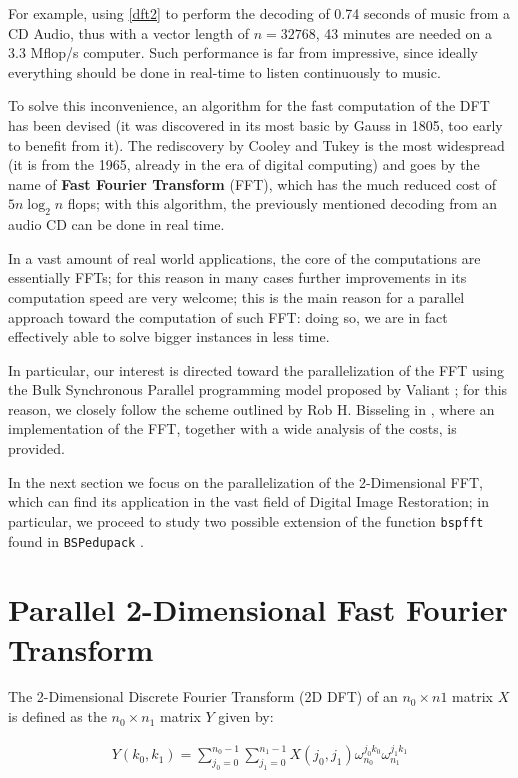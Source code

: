 \documentclass[a4paper,11pt]{article}
\begin{document}
For example, using \eqref{dft2} to perform the decoding of 0.74 seconds of music from a CD Audio, thus with a vector length of $n=32768$, 43 minutes are needed on a 3.3 Mflop/s computer. Such performance is far from impressive, since ideally everything should be done in real-time to listen continuously to music.

To solve this inconvenience, an algorithm for the fast computation of the DFT has been devised (it was discovered in its most basic by Gauss in 1805, too early to benefit from it). The rediscovery by Cooley and Tukey \citep{cooleytukey} is the most widespread (it is from the 1965, already in the era of digital computing) and goes by the name of \textbf{Fast Fourier Transform} (FFT), which has the much reduced cost of $5n \log_2 n$ flops; with this algorithm, the previously mentioned decoding from an audio CD can be done in real time.

In a vast amount of real world applications, the core of the computations are essentially FFTs; for this reason in many cases further improvements in its computation speed are very welcome; this is the main reason for a parallel approach toward the computation of such FFT: doing so, we are in fact effectively able to solve bigger instances in less time.

In particular, our interest is directed toward the parallelization of the FFT using the Bulk Synchronous Parallel programming model proposed by Valiant \citep{bsp}; for this reason, we closely follow the scheme outlined by Rob H. Bisseling in \citep{parsc}, where an implementation of the FFT, together with a wide analysis of the costs, is provided.

In the next section we focus on the parallelization of the 2-Dimensional FFT, which can find its application in the vast field of Digital Image Restoration; in particular, we proceed to study two possible extension of the function \verb|bspfft| found in \verb|BSPedupack| \citep{bspedupack}.


\section{Parallel 2-Dimensional Fast Fourier Transform}
The 2-Dimensional Discrete Fourier Transform (2D DFT) of an $n_0 \times n1$ matrix $X$ is defined as the $n_0 \times n_1$ matrix $Y$ given by:

\begin{align}
 \label{2dft} Y(k_0,k_1) = \sum_{j_0=0}^{n_0-1} \sum_{j_1=0}^{n_1-1} X(j_0,j_1) \omega_{n_0}^{j_0 k_0} \omega_{n_1}^{j_1 k_1}
\end{align}
\end{document}

